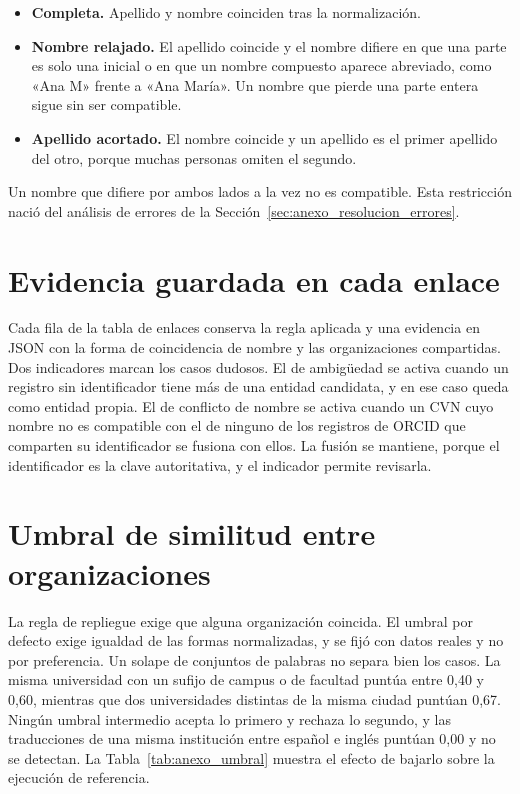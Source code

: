 \begin{itemize}
  \item \textbf{Completa.} Apellido y nombre coinciden tras la normalización.
  \item \textbf{Nombre relajado.} El apellido coincide y el nombre difiere en
  que una parte es solo una inicial o en que un nombre compuesto aparece
  abreviado, como «Ana M» frente a «Ana María». Un nombre que pierde una
  parte entera sigue sin ser compatible.
  \item \textbf{Apellido acortado.} El nombre coincide y un apellido es el
  primer apellido del otro, porque muchas personas omiten el segundo.
\end{itemize}

Un nombre que difiere por ambos lados a la vez no es compatible. Esta
restricción nació del análisis de errores de la
Sección~\ref{sec:anexo_resolucion_errores}.

\section{Evidencia guardada en cada enlace}
\label{sec:anexo_resolucion_evidencia}

Cada fila de la tabla de enlaces conserva la regla aplicada y una evidencia en
JSON con la forma de coincidencia de nombre y las organizaciones compartidas.
Dos indicadores marcan los casos dudosos. El de ambigüedad se activa cuando
un registro sin identificador tiene más de una entidad candidata, y en ese
caso queda como entidad propia. El de conflicto de nombre se activa cuando
un CVN cuyo nombre no es compatible con el de ninguno de los registros de
ORCID que comparten su identificador se fusiona con ellos. La fusión se
mantiene, porque el identificador es la clave autoritativa, y el indicador
permite revisarla.

\section{Umbral de similitud entre organizaciones}
\label{sec:anexo_resolucion_umbral}

La regla de repliegue exige que alguna organización coincida. El umbral por
defecto exige igualdad de las formas normalizadas, y se fijó con datos
reales y no por preferencia. Un solape de conjuntos de palabras no separa
bien los casos. La misma universidad con un sufijo de campus o de facultad
puntúa entre 0,40 y 0,60, mientras que dos universidades distintas de la
misma ciudad puntúan 0,67. Ningún umbral intermedio acepta lo primero y
rechaza lo segundo, y las traducciones de una misma institución entre
español e inglés puntúan 0,00 y no se detectan. La
Tabla~\ref{tab:anexo_umbral} muestra el efecto de bajarlo sobre la ejecución
de referencia.

